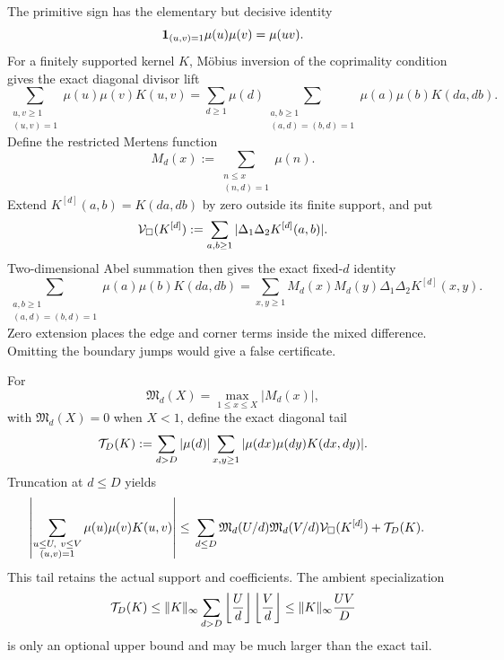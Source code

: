 The primitive sign has the elementary but decisive identity
\begin{equation}
 \mathbf 1_{(u,v)=1}\mu(u)\mu(v)=\mu(uv).
 \label{eq:tpc72-primitive-collapse}
\end{equation}
For a finitely supported kernel \(K\), M\"obius inversion of the
coprimality condition gives the exact diagonal divisor lift
\begin{equation}
 \sum_{\substack{u,v\ge1\\(u,v)=1}}
 \mu(u)\mu(v)K(u,v)
 =
 \sum_{d\ge1}\mu(d)
 \sum_{\substack{a,b\ge1\\(a,d)=(b,d)=1}}
 \mu(a)\mu(b)K(da,db).
 \label{eq:tpc72-diagonal-lift}
\end{equation}
Define the restricted Mertens function
\begin{equation}
 M_d(x)
 :=
 \sum_{\substack{n\le x\\(n,d)=1}}\mu(n).
 \label{eq:tpc72-restricted-Mertens}
\end{equation}
Extend \(K^{[d]}(a,b)=K(da,db)\) by zero outside its finite support, and put
\begin{equation}
 \mathcal V_\square(K^{[d]})
 :=
 \sum_{a,b\ge1}
 |\Delta_1\Delta_2K^{[d]}(a,b)|.
 \label{eq:tpc72-mixed-variation}
\end{equation}
Two-dimensional Abel summation then gives the exact fixed-\(d\) identity
\begin{equation}
 \sum_{\substack{a,b\ge1\\(a,d)=(b,d)=1}}
 \mu(a)\mu(b)K(da,db)
 =
 \sum_{x,y\ge1}
 M_d(x)M_d(y)\Delta_1\Delta_2K^{[d]}(x,y).
 \label{eq:tpc72-double-Abel}
\end{equation}
Zero extension places the edge and corner terms inside the mixed
difference.  Omitting the boundary jumps would give a false certificate.

For
\[
 \mathfrak M_d(X)=\max_{1\le x\le X}|M_d(x)|,
\]
with \(\mathfrak M_d(X)=0\) when \(X<1\), define the exact diagonal tail
\begin{equation}
 \mathcal T_D(K)
 :=
 \sum_{d>D}|\mu(d)|
 \sum_{x,y\ge1}
 |\mu(dx)\mu(dy)K(dx,dy)|.
 \label{eq:tpc72-exact-diagonal-tail}
\end{equation}
Truncation at \(d\le D\) yields
\begin{align}
 \left|
 \sum_{\substack{u\le U,\ v\le V\\(u,v)=1}}
 \mu(u)\mu(v)K(u,v)
 \right|
 \le{}&
 \sum_{d\le D}
 \mathfrak M_d(U/d)\mathfrak M_d(V/d)
 \mathcal V_\square(K^{[d]})
 +\mathcal T_D(K).
 \label{eq:tpc72-master-plane-certificate}
\end{align}
This tail retains the actual support and coefficients.  The ambient
specialization
\begin{equation}
 \mathcal T_D(K)
 \le
 \|K\|_\infty
 \sum_{d>D}
 \left\lfloor\frac Ud\right\rfloor
 \left\lfloor\frac Vd\right\rfloor
 \le
 \|K\|_\infty\frac{UV}{D}
 \label{eq:tpc72-ambient-tail}
\end{equation}
is only an optional upper bound and may be much larger than the exact tail.


